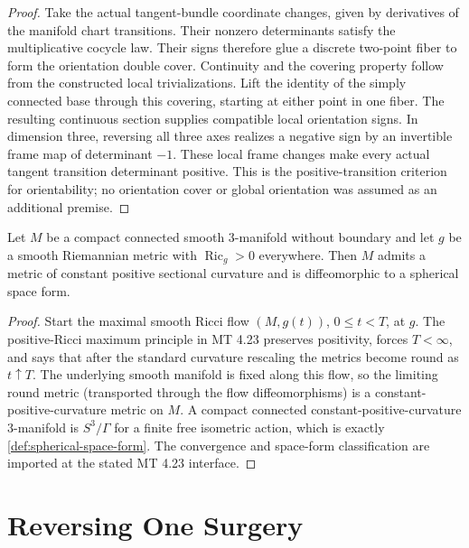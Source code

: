\begin{proof}
Take the actual tangent-bundle coordinate changes, given by derivatives of
the manifold chart transitions.  Their nonzero determinants satisfy the
multiplicative cocycle law.  Their signs therefore glue a discrete two-point
fiber to form the orientation double cover.  Continuity and the covering
property follow from the constructed local trivializations.  Lift the identity
of the simply connected base through this covering, starting at either point
in one fiber.  The resulting continuous section supplies compatible local
orientation signs.  In dimension three, reversing all three axes realizes a
negative sign by an invertible frame map of determinant $-1$.  These local
frame changes make every actual tangent transition determinant positive.
This is the positive-transition criterion for orientability; no orientation
cover or global orientation was assumed as an additional premise.
\end{proof}

\begin{theorem}
\label{thm:positive-ricci-three-manifold-roundness}
\notready
Let $M$ be a compact connected smooth $3$-manifold without boundary and let
$g$ be a smooth Riemannian metric with $\operatorname{Ric}_g>0$ everywhere.
Then $M$ admits a metric of constant positive sectional curvature and is
diffeomorphic to a spherical space form.
\end{theorem}

\begin{proof}
Start the maximal smooth Ricci flow $(M,g(t))$, $0\le t<T$, at $g$.  The
positive-Ricci maximum principle in MT 4.23 preserves positivity, forces
$T<\infty$, and says that after the standard curvature rescaling the metrics
become round as $t\uparrow T$.  The underlying smooth manifold is fixed along
this flow, so the limiting round metric (transported through the flow
diffeomorphisms) is a constant-positive-curvature metric on $M$.  A compact
connected constant-positive-curvature $3$-manifold is $S^3/\Gamma$ for a finite
free isometric action, which is exactly
\ref{def:spherical-space-form}.  The convergence and space-form
classification are imported at the stated MT 4.23 interface.
\end{proof}

\section{Reversing One Surgery}

